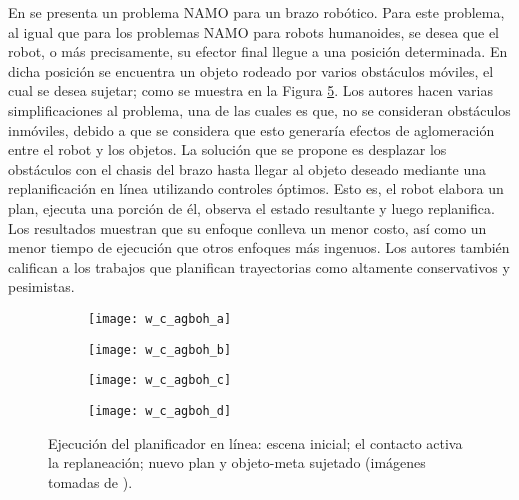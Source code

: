 En \cite{8625041} se presenta un problema NAMO para un brazo robótico.
Para este problema, al igual que para los problemas NAMO para robots humanoides, se desea que el robot, o más precisamente, su efector final llegue a una posición determinada.
En dicha posición se encuentra un objeto rodeado por varios obstáculos móviles, el cual se desea sujetar; como se muestra en la Figura \ref{fig:8625041}.
Los autores hacen varias simplificaciones al problema, una de las cuales es que, no se consideran obstáculos inmóviles, debido a que se considera que esto generaría efectos de aglomeración entre el robot y los objetos.
La solución que se propone es desplazar los obstáculos con el chasis del brazo hasta llegar al objeto deseado mediante una replanificación en línea utilizando controles óptimos.
Esto es, el robot elabora un plan, ejecuta una porción de él, observa el estado resultante y luego replanifica.
Los resultados muestran que su enfoque conlleva un menor costo, así como un menor tiempo de ejecución que otros enfoques más ingenuos.
Los autores también califican a los trabajos que planifican trayectorias como altamente conservativos y pesimistas.
%
\begin{figure}[H]
	\begin{subfigure}{0.35\linewidth}
		\texttt{[image: w\_c\_agboh\_a]}%
		\subcaption{}%
		\label{subfig:start_scene}%
	\end{subfigure}%
	\hspace{0.5cm}%
	\begin{subfigure}{0.35\linewidth}
		\texttt{[image: w\_c\_agboh\_b]}%
		\subcaption{}%
		\label{subfig:contact_replaning}%
	\end{subfigure}%
	
	\vspace{3pt}%
	\begin{subfigure}{0.35\linewidth}
		\texttt{[image: w\_c\_agboh\_c]}%
		\subcaption{}%
		\label{subfig:new_plan}%
	\end{subfigure}%
	\hspace{0.5cm}%
	\begin{subfigure}{0.35\linewidth}
		\texttt{[image: w\_c\_agboh\_d]}%
		\subcaption{}%
		\label{subfig:target_object_grasp}%
	\end{subfigure}%
	\caption{Ejecución del planificador en línea:  escena inicial;  el contacto activa la replaneación;  nuevo plan y  objeto-meta sujetado (imágenes tomadas de \cite{8625041}).}%
	\label{fig:8625041}%
\end{figure}
